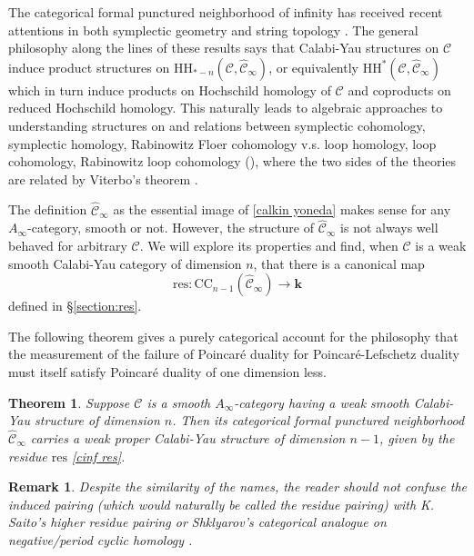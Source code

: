 \documentclass[11pt]{amsproc}
\def\K{{\mathbf{k}}}
\def\cc{\mathcal{C}}
\def\r#1{\mathrm{#1}}
\def\ainf{A_\infty}
\def\cinf{\widehat{\cc}_{\infty}}
\newtheorem{thm}[lem]{Theorem}
\newtheorem{rem}[lem]{Remark}
\theoremstyle{remark}
\numberwithin{equation}{section}
\begin{document}
The categorical formal punctured neighborhood of infinity has received recent attentions in both symplectic geometry \cite{GGV} and string topology \cite{rivera-takeda-wang}.
The general philosophy along the lines of these results says that Calabi-Yau structures on $\cc$ induce product structures on $\r{HH}_{*-n}(\cc, \cinf)$, or equivalently $\r{HH}^{*}(\cc, \cinf)$
which in turn induce products on Hochschild homology of $\cc$ and coproducts on reduced Hochschild homology.
This naturally leads to algebraic approaches to understanding structures on and relations between symplectic cohomology, symplectic homology, Rabinowitz Floer cohomology v.s. loop homology, loop cohomology, Rabinowitz loop cohomology (\cite{CHOduality}),
where the two sides of the theories are related by Viterbo's theorem \cites{Viterbo1, abouzaid_sh, BDHO_dg}.

The definition $\cinf$ as the essential image of \eqref{calkin yoneda} makes sense for any $\ainf$-category, smooth or not.
However, the structure of $\cinf$ is not always well behaved for arbitrary $\cc$.
We will explore its properties and find, when $\cc$ is a weak smooth Calabi-Yau category of dimension $n$,
that there is a canonical map
\begin{equation}\label{cinf res}
\r{res}: \r{CC}_{n-1}(\cinf) \to \K
\end{equation}
defined in \S\ref{section:res}.

The following theorem gives a purely categorical account for the philosophy that the measurement of the failure of Poincar\'{e} duality for Poincar\'{e}-Lefschetz duality must itself satisfy Poincar\'{e} duality of one dimension less.

\begin{thm}\label{thm: cinf cy}
Suppose $\cc$ is a smooth $\ainf$-category having a weak smooth Calabi-Yau structure of dimension $n$.
Then its categorical formal punctured neighborhood $\cinf$ carries a weak proper Calabi-Yau structure of dimension $n-1$,
given by the residue $\r{res}$ \eqref{cinf res}.
\end{thm}

\begin{rem}
Despite the similarity of the names,
the reader should not confuse the induced pairing (which would naturally be called the residue pairing) with K. Saito's higher residue pairing \cite{saito} or Shklyarov's categorical analogue on negative/period cyclic homology \cite{shklyarov2}.
\end{rem}
\end{document}
